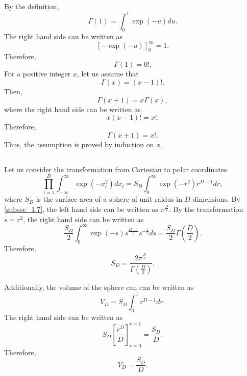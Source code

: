 By the definition, 
%
\begin{equation}
\Gamma(1) = \int_{0}^{1} \exp(- u) du.
\end{equation}
%
The right hand side can be written as
%
\begin{equation}
\left[- \exp(- u) \right]_{0}^{\infty} = 1.
\end{equation}
%
Therefore,
%
\begin{equation}
\Gamma(1) = 0!.
\end{equation}
%
For a positive integer $x$, let us assume that
%
\begin{equation}
\Gamma(x) = (x - 1)!.
\end{equation}
%
Then,
%
\begin{equation}
\Gamma(x + 1) = x \Gamma(x),
\end{equation}
%
where the right hand side can be written as
%
\begin{equation}
x (x - 1)! = x!.
\end{equation}
%
Therefore,
%
\begin{equation}
\Gamma(x + 1) = x!.
\end{equation}
%
Thus, the assumption is proved by induction on $x$.


\subsection{}
\label{subsec_1.18}
Let us consider the transformation from Cartesian to polar coordinates
%
\begin{equation}
\prod_{i = 1}^{D} \int_{- \infty}^{\infty} \exp \left( - x_i ^ 2 \right) dx_i = S_D \int_{0}^{\infty} \exp \left( - r ^ 2 \right) r ^ {D - 1} dr,
\end{equation}
%
where $S_D$ is the surface area of a sphere of unit raidus in $D$ dimensions. 
By \ref{subsec_1.7}, the left hand side can be written as $\pi ^ \frac{D}{2}$. By the transformation $s = r ^ 2$, the right hand side can be written as
%
\begin{equation}
\frac{S_D}{2} \int_0^\infty \exp(- s) s ^ \frac{D - 1}{2} s ^ {- \frac{1}{2}} ds = \frac{S_D}{2} \Gamma \left( \frac{D}{2} \right).
\end{equation}
%
Therefore,
%
\begin{equation}
S_D = \frac{2 \pi ^ \frac{D}{2}}{\Gamma \left( \frac{D}{2} \right)}.
\end{equation}
%

Additionally, the volume of the sphere can can be written as
%
\begin{equation}
V_D = S_D \int_{0}^{1} r^{D - 1} dr.
\end{equation}
%
The right hand side can be written as 
%
\begin{equation}
S_D \left[ \frac{r ^ D}{D} \right]_{r = 0}^{r = 1} = \frac{S_D}{D}.
\end{equation}
%
Therefore, 
%
\begin{equation}
V_D = \frac{S_D}{D}.
\end{equation}
%

